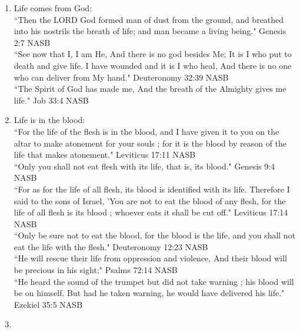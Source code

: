 \begin{enumerate}
  \item Life comes from God:
    \\
    ``Then the LORD God formed man of dust from the ground,
    and breathed into his nostrils the breath of life;
    and man became a living being."  Genesis 2:7 NASB
   \\
   ``See now that I, I am He, And there is no god besides Me; It is I who put to death and give life. I have wounded and it is I who heal, And there is no one who can deliver from My hand."
   Deuteronomy 32:39 NASB
    \\
    ``The Spirit of God has made me, And the breath of the Almighty gives me life."
    Job 33:4 NASB

  \item Life is in the blood:
    \\
    ``For the life of the flesh is in the blood, and I have given it to you on the altar to make atonement for your souls ; for it is the blood by reason of the life that makes atonement."
    Leviticus 17:11 NASB
    \\
    ``Only you shall not eat flesh with its life, that is, its blood." Genesis 9:4 NASB
    \\
    ``For as for the life of all flesh, its blood is identified with its life. Therefore I said to the sons of Israel, 'You are not to eat the blood of any flesh, for the life of all flesh is its blood ; whoever eats it shall be cut off."
    Leviticus 17:14 NASB
    \\
    ``Only be sure not to eat the blood, for the blood is the life, 
     and you shall not eat the life with the flesh."
    Deuteronomy 12:23 NASB
    \\
    ``He will rescue their life from oppression and violence, And their blood will be precious in his sight;"
    Psalms 72:14 NASB
    \\ 
    ``He heard the sound of the trumpet but did not take warning ; his blood will be on himself. But had he taken warning, he would have delivered his life."
    Ezekiel 35:5 NASB

  \item 
\end{enumerate}